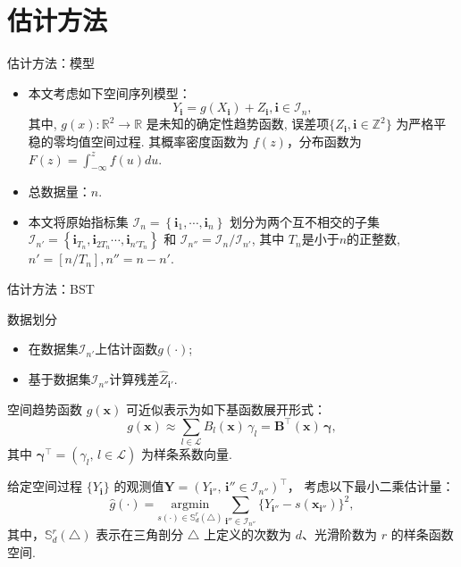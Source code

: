 \documentclass{beamer}
\begin{document}
\section{估计方法}
\begin{frame}{估计方法：模型}
\begin{itemize}
    \item 本文考虑如下空间序列模型：
        \begin{equation}\label{model:nonparbiregression}
            Y_{\mathbf{i}} = g(X_{\mathbf{i}})+Z_{\mathbf{i}}, \mathbf{i}\in \mathcal{I}_n,
        \end{equation}
其中, $g(x):\mathbb{R}^2 \rightarrow \mathbb{R}$ 是未知的确定性趋势函数,  误差项$\{Z_{\mathbf{i}},\mathbf{i}\in\mathbb{Z}^2\}$ 为严格平稳的零均值空间过程. 其概率密度函数为 $f(z)$，分布函数为 $F(z)=\int_{-\infty}^{z}f(u)du$.
    \item 总数据量：$n$.
    \item 本文将原始指标集 $\mathcal{I}_n=\left\{\mathbf{i}_1,\cdots,\mathbf{i}_n\right\}$ 划分为两个互不相交的子集 $\mathcal{I}_{n'}=\left\{\mathbf{i}_{T_n},\mathbf{i}_{2T_n}\cdots,\mathbf{i}_{n'T_n}\right\}$ 和 $ \mathcal{I}_{n''} = \mathcal{I}_{n}/\mathcal{I}_{n'}$, 其中 $T_{n}$是小于$n$的正整数, $n' = [n/T_{n}], n''=n-n'$.
\end{itemize}
\end{frame}

\begin{frame}{估计方法：BST}
\begin{block}{数据划分}
\begin{itemize}
    \item 在数据集$\mathcal{I}_{n'}$上估计函数$g(\cdot)$;
    \item 基于数据集$\mathcal{I}_{n''}$计算残差$\hat{Z}_{\mathbf{i}'}$.
\end{itemize}
\end{block}

空间趋势函数 $g(\boldsymbol{x})$ 可近似表示为如下基函数展开形式：
\[
  g(\boldsymbol{x})
   \approx \sum_{l\in\mathcal{L}} B_l(\boldsymbol{x})\,\gamma_l
  = \mathbf{B}^\top(\boldsymbol{x})\,\boldsymbol{\gamma},
\]
其中 $\boldsymbol{\gamma}^\top=(\gamma_l,\,l\in\mathcal{L})$ 为样条系数向量.

给定空间过程 $\{Y_{\mathbf{i}}\}$ 的观测值$\mathbf{Y}=(Y_{\mathbf{i}''},\,\mathbf{i}''\in\mathcal{I}_{n''})^\top$，  
考虑以下最小二乘估计量：
\begin{equation}
  \hat{g}(\cdot)
  = \underset{s(\cdot)\in \mathbb{S}_{d}^{r}(\triangle)}{\mathrm{argmin}}
  \sum_{\mathbf{i}''\in\mathcal{I}_{n''}}\!
  \bigl\{Y_{\mathbf{i}''}-s(\boldsymbol{x}_{\mathbf{i}''})\bigr\}^2,
\end{equation}
其中，$\mathbb{S}_{d}^{r}(\triangle)$ 表示在三角剖分 $\triangle$ 上定义的次数为 $d$、光滑阶数为 $r$ 的样条函数空间.
\end{frame}
\end{document}
